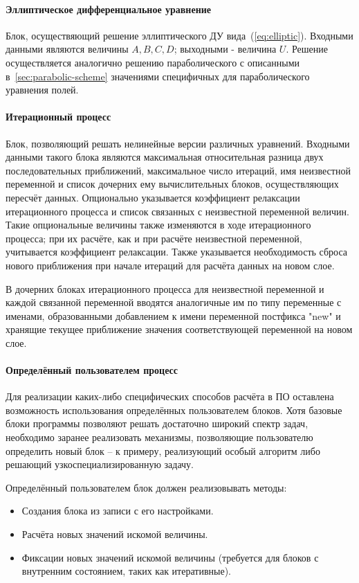 \paragraph{Эллиптическое дифференциальное уравнение}
Блок, осуществяющий решение эллиптического ДУ вида~(\ref{eq:elliptic}). 
Входными данными являются величины $A,B,C,D$; выходными - величина $U$. 
Решение осуществляется аналогично решению параболического с описанными 
в~\ref{sec:parabolic-scheme} значениями специфичных для параболического 
уравнения полей.
 
\paragraph{Итерационный процесс}
Блок, позволяющий решать нелинейные версии различных уравнений. Входными 
данными такого блока являются максимальная относительная разница двух 
последовательных приближений, максимальное число итераций, имя неизвестной 
переменной и список дочерних ему вычислительных блоков, осуществляющих пересчёт 
данных. Опционально указывается коэффициент релаксации итерационного процесса и 
список связанных с неизвестной переменной величин. Такие опциональные величины 
также изменяются в ходе итерационного процесса; при их расчёте, как и при 
расчёте неизвестной переменной, учитывается коэффициент релаксации. Также 
указывается необходимость сброса нового приближения при начале итераций для 
расчёта данных на новом слое.

В дочерних блоках итерационного процесса для неизвестной переменной и каждой 
связанной переменной вводятся аналогичные им по типу переменные с именами, 
образованными добавлением к имени переменной постфикса "new" и хранящие текущее 
приближение значения соответствующей переменной на новом слое.

\paragraph{Определённый пользователем процесс}
Для реализации каких-либо специфических способов расчёта в ПО оставлена 
возможность использования определённых пользователем блоков. Хотя базовые блоки 
программы позволяют решать достаточно широкий спектр задач, необходимо заранее 
реализовать механизмы, позволяющие пользователю определить новый блок -- к 
примеру, реализующий особый алгоритм либо решающий узкоспециализированную 
задачу.

Определённый пользователем блок должен реализовывать методы:
\begin{itemize}
    \item Создания блока из записи с его настройками.
    \item Расчёта новых значений искомой величины.
    \item Фиксации новых значений искомой величины (требуется для блоков с 
    внутренним состоянием, таких как итеративные).
\end{itemize}

